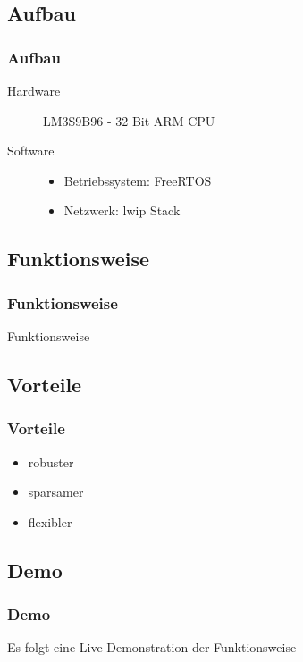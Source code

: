 \documentclass{beamer}
\begin{document}
\subsection{Aufbau}
\begin{frame}\frametitle{Aufbau}
  \begin{description}
    \item [Hardware] LM3S9B96 - 32 Bit ARM CPU
    \item [Software] 
      \begin{itemize}
        \item Betriebssystem: FreeRTOS
        \item Netzwerk: lwip Stack
      \end{itemize}
  \end{description}
\end{frame}

\subsection{Funktionsweise}
\begin{frame}\frametitle{Funktionsweise}
Funktionsweise
\end{frame}


\subsection{Vorteile}
\begin{frame}\frametitle{Vorteile}
  \begin{itemize}
    \item robuster
    \item sparsamer
    \item flexibler
  \end{itemize}
\end{frame}

\subsection{Demo}
\begin{frame}\frametitle{Demo}
  Es folgt eine Live Demonstration der Funktionsweise
\end{frame}
\end{document}
